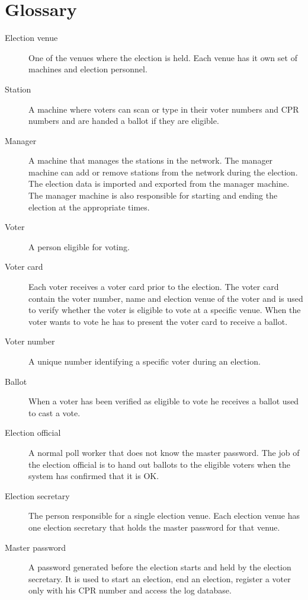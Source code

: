 \documentclass[a4paper]{report}
\begin{document}
\chapter{Glossary}
\begin{description}

\item[Election venue] One of the venues where the election is held. Each venue has it own set of machines and election personnel.

\item[Station] A machine where voters can scan or type in their voter numbers and CPR numbers and are handed a ballot if they are eligible. 

\item[Manager] A machine that manages the stations in the network. The manager machine can add or remove stations from the network during the election. The election data is imported and exported from the manager machine. The manager machine is also responsible for starting and ending the election at the appropriate times.

\item[Voter] A person eligible for voting.

\item[Voter card] Each voter receives a voter card prior to the election. The voter card contain the voter number, name and election venue of the voter and is used to verify whether the voter is eligible to vote at a specific venue. When the voter wants to vote he has to present the voter card to receive a ballot.

\item[Voter number] A unique number identifying a specific voter during an election.

\item[Ballot] When a voter has been verified as eligible to vote he receives a ballot used to cast a vote.

\item[Election official] A normal poll worker that does not know the master password. The job of the election official is to hand out ballots to the eligible voters when the system has confirmed that it is OK. 

\item[Election secretary] The person responsible for a single election venue. Each election venue has one election secretary that holds the master password for that venue.

\item[Master password] A password generated before the election starts and held by the election secretary. It is used to start an election, end an election, register a voter only with his CPR number and access the log database.

\end{description}
\end{document}
